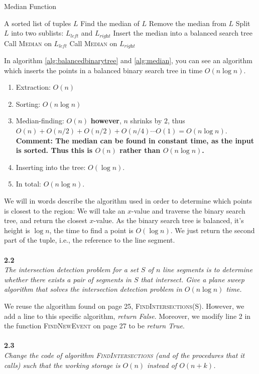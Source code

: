\begin{algorithm}
	\label{alg:median}
	\caption{Median Function}
	\begin{algorithmic}[1]
		\REQUIRE A sorted list of tuples $L$
		\STATE Find the median of $L$
		\STATE Remove the median from $L$
		\STATE Split $L$ into two sublists: $L_{\textit{left}}$ and $L_{\textit{right}}$
		\STATE Insert the median into a balanced search tree
		\STATE Call \textsc{Median} on $L_{\textit{left}}$
		\STATE Call \textsc{Median} on $L_{\textit{right}}$
		\ENDIF
	\end{algorithmic}
\end{algorithm}

In algorithm \ref{alg:balancedbinarytree} and \ref{alg:median}, you can see an algorithm which inserts the points in a balanced binary search tree in time $O(n \log n)$.
\begin{enumerate}
	\item Extraction: $O(n)$
	\item Sorting: $O(n \log n)$
	\item Median-finding: $O(n)$ \textbf{however}, $n$ shrinks by $2$, thus $O(n) + O(n/2) + O(n/2) + O(n/4) \cdots O(1) = O(n \log n)$. \textbf{Comment: The median can be found in constant time, as the input is sorted. Thus this is $O(n)$ rather than $O(n \log n)$.}
	\item Inserting into the tree: $O(\log n)$.
	\item In total: $O(n \log n)$.
\end{enumerate}

We will in words describe the algorithm used in order to determine which points is closest to the region: We will take an $x$-value and traverse the binary search tree, and return the closest $x$-value. As the binary search tree is balanced, it's height is $\log n$, the time to find a point is $O(\log n)$. We just return the second part of the tuple, i.e., the reference to the line segment.
\\\\
\noindent
\textbf{2.2}\\
\noindent
\textit{The intersection detection problem for a set $S$ of $n$ line segments is to determine whether there exists a pair of segments in $S$ that intersect. Give a plane sweep algorithm that solves the intersection detection problem in $O(n \log n)$ time.}

We reuse the algorithm found on page 25, \textsc{FindIntersections(S)}. However, we add a line to this specific algorithm, \textit{return False}. Moreover, we modify line 2 in the function \textsc{FindNewEvent} on page 27 to be \textit{return True}.
\\\\
\noindent
\textbf{2.3}\\
\noindent
\textit{Change the code of algorithm \textsc{FindIntersections} (and of the procedures that it calls) such that the working storage is $O(n)$ instead of $O(n+k)$.}

